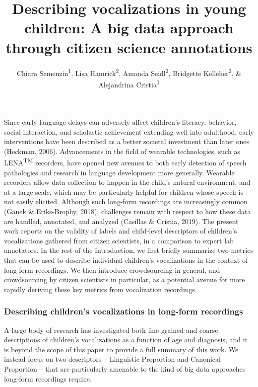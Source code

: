 \documentclass[english,,man,floatsintext]{apa6}
\author{Chiara Semenzin\textsuperscript{1}, Lisa Hamrick\textsuperscript{2}, Amanda Seidl\textsuperscript{2}, Bridgette Kelleher\textsuperscript{2}, \& Alejandrina Cristia\textsuperscript{1}}
\affiliation{
\vspace{0.5cm}
\textsuperscript{1} Laboratoire de Sciences Cognitives et de Psycholinguistique, Département d'Etudes cognitives, ENS, EHESS, CNRS, PSL University\\\textsuperscript{2} Purdue University}
\title{Describing vocalizations in young children: A big data approach through citizen science annotations}
\date{}
\begin{document}
\maketitle

Since early language delays can adversely affect children's literacy, behavior, social interaction, and scholastic achievement extending well into adulthood, early interventions have been described as a better societal investment than later ones (Heckman, 2006). Advancements in the field of wearable technologies, such as LENA\textsuperscript{TM} recorders, have opened new avenues to both early detection of speech pathologies and research in language development more generally. Wearable recorders allow data collection to happen in the child's natural environment, and at a large scale, which may be particularly helpful for children whose speech is not easily elicited. Although such long-form recordings are increasingly common (Ganek \& Eriks-Brophy, 2018), challenges remain with respect to how these data are handled, annotated, and analyzed (Casillas \& Cristia, 2019). The present work reports on the validity of labels and child-level descriptors of children's vocalizations gathered from citizen scientists, in a comparison to expert lab annotators. In the rest of the Introduction, we first briefly summarize two metrics that can be used to describe individual children's vocalizations in the context of long-form recordings. We then introduce crowdsourcing in general, and crowdsourcing by citizen scientists in particular, as a potential avenue for more rapidly deriving these key metrics from vocalization recordings.

\hypertarget{describing-childrens-vocalizations-in-long-form-recordings}{%
\subsubsection{Describing children's vocalizations in long-form recordings}\label{describing-childrens-vocalizations-in-long-form-recordings}}

A large body of research has investigated both fine-grained and coarse descriptions of children's vocalizations as a function of age and diagnosis, and it is beyond the scope of this paper to provide a full summary of this work. We instead focus on two descriptors -- Linguistic Proportion and Canonical Proportion -- that are particularly amenable to the kind of big data approaches long-form recordings require.
\end{document}
